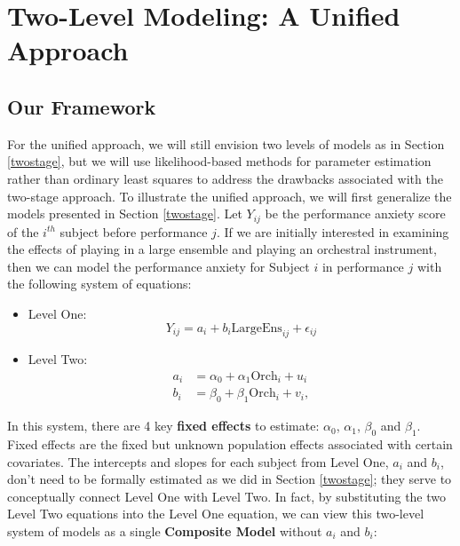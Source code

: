 \documentclass[
]{krantz}
\providecommand{\tightlist}{%
  \setlength{\itemsep}{0pt}\setlength{\parskip}{0pt}}
\begin{document}
\hypertarget{twolevelmodelingunified}{%
\section{Two-Level Modeling: A Unified Approach}\label{twolevelmodelingunified}}

\hypertarget{ourframework}{%
\subsection{Our Framework}\label{ourframework}}

For the unified approach, we will still envision two levels of models as in Section \ref{twostage}, but we will use likelihood-based methods for parameter estimation rather than ordinary least squares to address the drawbacks associated with the two-stage approach. To illustrate the unified approach, we will first generalize the models presented in Section \ref{twostage}. Let \(Y_{ij}\) be the performance anxiety score of the \(i^{th}\) subject before performance \(j\). If we are initially interested in examining the effects of playing in a large ensemble and playing an orchestral instrument, then we can model the performance anxiety for Subject \(i\) in performance \(j\) with the following system of equations:

\begin{itemize}
\tightlist
\item
  Level One:
  \begin{equation*}
  Y_{ij} = a_{i}+b_{i}\textrm{LargeEns}_{ij}+\epsilon_{ij}
  \end{equation*}
\item
  Level Two:
  \begin{align*}
  a_{i} & = \alpha_{0}+\alpha_{1}\textrm{Orch}_{i}+u_{i} \\
  b_{i} & = \beta_{0}+\beta_{1}\textrm{Orch}_{i}+v_{i},
  \end{align*}
\end{itemize}

In this system, there are 4 key \textbf{fixed effects} to estimate: \(\alpha_{0}\), \(\alpha_{1}\), \(\beta_{0}\) and \(\beta_{1}\). Fixed effects are the fixed but unknown population effects associated with certain covariates. The intercepts and slopes for each subject from Level One, \(a_{i}\) and \(b_{i}\), don't need to be formally estimated as we did in Section \ref{twostage}; they serve to conceptually connect Level One with Level Two. In fact, by substituting the two Level Two equations into the Level One equation, we can view this two-level system of models as a single \textbf{Composite Model}  without \(a_{i}\) and \(b_{i}\):
\end{document}
